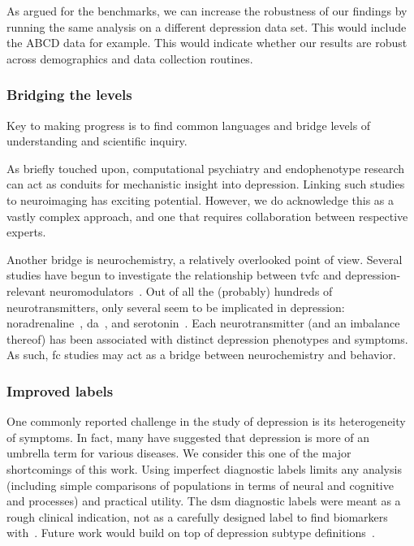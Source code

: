 As argued for the benchmarks, we can increase the robustness of our findings by running the same analysis on a different depression data set.
This would include the ABCD data for example.
This would indicate whether our results are robust across demographics and data collection routines.

\subsubsection{Bridging the levels}

Key to making progress is to find common languages and bridge levels of understanding and scientific inquiry.

As briefly touched upon, computational psychiatry and endophenotype research can act as conduits for mechanistic insight into depression.
Linking such studies to neuroimaging has exciting potential.
However, we do acknowledge this as a vastly complex approach, and one that requires collaboration between respective experts.

Another bridge is neurochemistry, a relatively overlooked point of view.
Several studies have begun to investigate the relationship between \gls{tvfc} and depression-relevant neuromodulators~\parencite{Shine2019}.
Out of all the (probably) hundreds of neurotransmitters, only several seem to be implicated in depression: noradrenaline~\parencite[also known as norepinephrine; a neurotransmitter found in pleasure pathways; see][]{Shine2018}, \gls{da}~\parencite{Shafiei2019}, and serotonin~\parencite{Klaassens2017}.
Each neurotransmitter (and an imbalance thereof) has been associated with distinct depression phenotypes and symptoms.
As such, \gls{fc} studies may act as a bridge between neurochemistry and behavior.

\subsubsection{Improved labels}

One commonly reported challenge in the study of depression is its heterogeneity of symptoms.
In fact, many have suggested that depression is more of an umbrella term for various diseases.
We consider this one of the major shortcomings of this work.
Using imperfect diagnostic labels limits any analysis (including simple comparisons of populations in terms of neural and cognitive and processes) and practical utility.
The \gls{dsm} diagnostic labels were meant as a rough clinical indication, not as a carefully designed label to find biomarkers with~\parencite{Fried2022b}.
Future work would build on top of depression subtype definitions~\parencite{Tokuda2018}.

